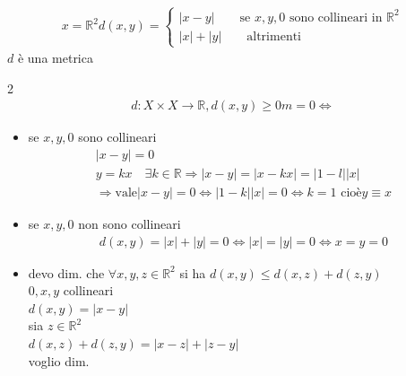 \documentclass[a4paper, oneside]{article}
\begin{document}
    \begin{example}
        \begin{gather*}
            x= \mathbb{R}^2 d(x,y) =
            \begin{cases}
                |x-y| \qquad \text{se $x,y,0$ sono collineari in $\mathbb{R}^2$}\\
                |x|+|y| \qquad \text{altrimenti}
            \end{cases}
        \end{gather*}
                $d$ è una metrica\\
        \begin{multicols}{2}
            \noindent
                \begin{gather*}
                    d:X \times X \to \mathbb{R} , d(x,y) \geq 0m = 0 \Leftrightarrow 
                \end{gather*}
            \columnbreak
            \begin{itemize}
                \item se $x,y,0$ sono collineari 
                \begin{gather*}
                    |x-y|=0\\
                    y=kx \quad \exists k \in \mathbb{R} \Rightarrow |x-y| = |x-kx| = |1-l| |x|\\
                    \Rightarrow \text{vale} |x-y| = 0 \Leftrightarrow |1-k| |x| = 0 \Leftrightarrow k=1 \text{ cioè} y \equiv x
                \end{gather*}
                \item se $x,y,0$ non sono collineari
                \begin{gather*}
                    d(x,y) = |x| + |y| = 0 \Leftrightarrow |x| = |y| = 0 \Leftrightarrow x = y = 0
                \end{gather*}
                \item devo dim. che $\forall x,y,z \in \mathbb{R}^2$ si ha $d(x,y) \leq d(x,z) + d(z,y)$\\
                 $0,x,y$ collineari\\
                    $d(x,y) = |x-y|$\\
                    sia $z \in \mathbb{R}^2$  \\
                     $d(x,z) +  d(z,y) = |x-z|+|z-y|$\\
                    voglio dim.
                    \begin{gather*}

\end{gather*}
\end{itemize}
\end{multicols}
\end{example}
\end{document}
